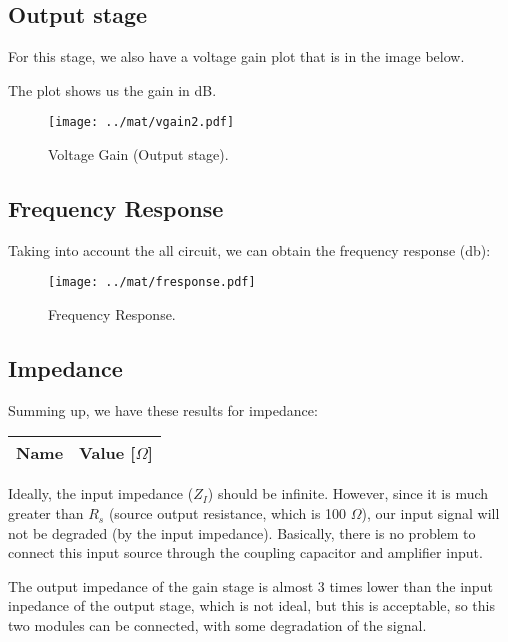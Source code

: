 \subsection{Output stage}
For this stage, we also have a voltage gain plot that is in the image below.\par
The plot shows us the gain in dB.

\begin{figure}[H] \centering
\texttt{[image: ../mat/vgain2.pdf]}
\caption{Voltage Gain (Output stage).}
\label{fig:vgain2}
\end{figure}

\subsection{Frequency Response}
Taking into account the all circuit, we can obtain the frequency response (db):\par

\begin{figure}[H] \centering
\texttt{[image: ../mat/fresponse.pdf]}
\caption{Frequency Response.}
\label{fig:fresponse}
\end{figure}

\subsection{Impedance}

Summing up, we have these results for impedance:\par

\begin{center}
  \begin{tabular}{ | c | c | }
    \hline    
    {\bf Name} & {\bf Value [$\Omega$]} \\ \hline
    
    \hline
  \end{tabular}
\end{center}

Ideally, the input impedance ($Z_I$) should be infinite. However, since it is much greater than $R_s$ (source output resistance, which is 100 $\Omega$), our input signal will not be degraded (by the input impedance). Basically, there is no problem to connect this input source through the coupling capacitor and amplifier input.\par
The output impedance of the gain stage is almost 3 times lower than the input inpedance of the output stage, which is not ideal, but this is acceptable, so this two modules can be connected, with some degradation of the signal.\par
